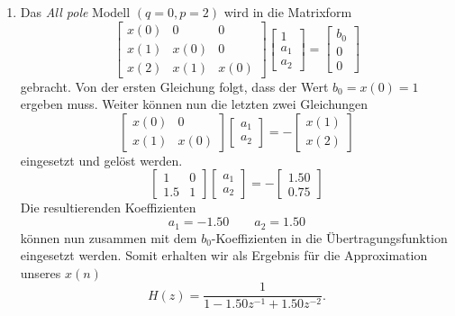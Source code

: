\begin{beispiel}
\begin{enumerate}
\item Das {\em All pole} Modell $(q=0,p=2)$ wird in die Matrixform
%
\begin{equation}\left[\begin{array}{ccc}
x(0) & 0 & 0 \\
x(1) & x(0) & 0 \\
x(2) & x(1) & x(0)
\end{array}\right]\left[\begin{array}{c}
1 \\
a_1 \\
a_2
\end{array}\right]=\left[\begin{array}{c}
b_0 \\
0 \\
0
\end{array}\right]\end{equation}
gebracht. 
Von der ersten Gleichung folgt, dass der Wert $b_0 = x(0)=1$ ergeben muss. 
Weiter können nun die letzten zwei Gleichungen
\begin{equation}\left[\begin{array}{ll}
x(0) & 0 \\
x(1) & x(0)
\end{array}\right]\left[\begin{array}{l}
a_1 \\
a_2
\end{array}\right]=-\left[\begin{array}{l}
x(1) \\
x(2)
\end{array}\right]\end{equation}
eingesetzt und gelöst werden.
\begin{equation}\left[\begin{array}{cc}
1 & 0 \\
1.5 & 1
\end{array}\right]\left[\begin{array}{l}
a_1 \\
a_2
\end{array}\right]=-\left[\begin{array}{c}
1.50 \\
0.75
\end{array}\right]\end{equation}
Die resultierenden Koeffizienten
\begin{equation}
a_1=-1.50 \quad  \quad a_2=1.50
\end{equation}
können nun zusammen mit dem $b_0$-Koeffizienten in die Übertragungsfunktion  
eingesetzt werden.
Somit erhalten wir als Ergebnis für die Approximation unseres $x(n)$ 
\begin{equation}
H(z)=\frac{1}{1-1.50 z^{-1}+1.50 z^{-2}}.
\end{equation}


\end{enumerate}
\end{beispiel}
